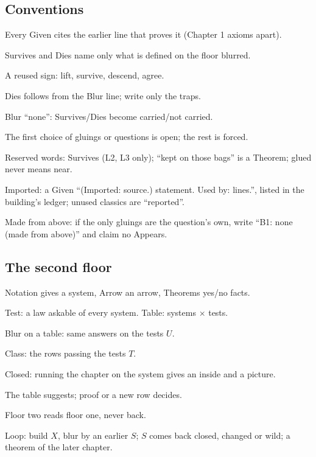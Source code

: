 \subsection*{Conventions}
\begin{lines}
\item[\lab{C1}] Every Given cites the earlier line that proves it (Chapter 1 axioms apart).
\item[\lab{C2}] Survives and Dies name only what is defined on the floor blurred.
\item[\lab{C3}] A reused sign: lift, survive, descend, agree.
\item[\lab{C4}] Dies follows from the Blur line; write only the traps.
\item[\lab{C5}] Blur ``none'': Survives/Dies become carried/not carried.
\item[\lab{C6}] The first choice of gluings or questions is open; the rest is forced.
\item[\lab{C7}] Reserved words: Survives (L2, L3 only); ``kept on those bags'' is a Theorem; glued never means near.
\item[\lab{C8}] Imported: a Given ``(Imported: source.) statement. Used by: lines.'', listed in the building's ledger; unused classics are ``reported''.
\item[\lab{C9}] Made from above: if the only gluings are the question's own, write ``B1: none (made from above)'' and claim no Appears.
\end{lines}

\subsection*{The second floor}
\begin{lines}
\item[\lab{F1}] Notation gives a system, Arrow an arrow, Theorems yes/no facts.
\item[\lab{F2}] Test: a law askable of every system. Table: systems $\times$ tests.
\item[\lab{F3}] Blur on a table: same answers on the tests $U$.
\item[\lab{F4}] Class: the rows passing the tests $T$.
\item[\lab{F5}] Closed: running the chapter on the system gives an inside and a picture.
\item[\lab{F6}] The table suggests; proof or a new row decides.
\item[\lab{F7}] Floor two reads floor one, never back.
\item[\lab{F8}] Loop: build $X$, blur by an earlier $S$; $S$ comes back closed, changed or wild; a theorem of the later chapter.
\end{lines}

